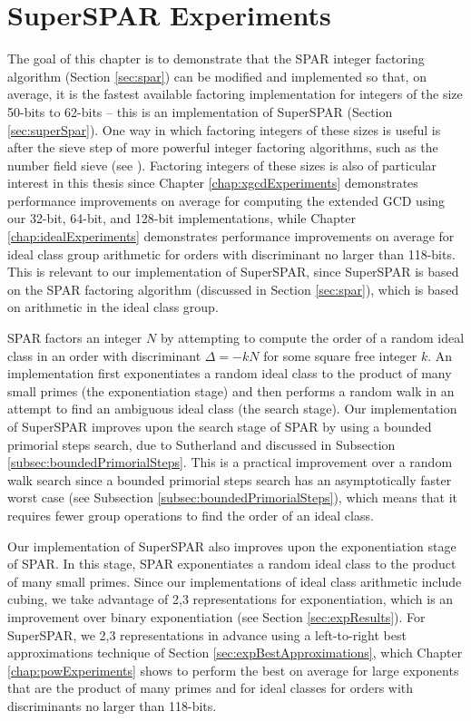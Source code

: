 \documentclass{ucalgthes1}
\theoremstyle{definition}
\begin{document}
\chapter{SuperSPAR Experiments}
\label{chap:ssparExperiments}

The goal of this chapter is to demonstrate that the SPAR integer factoring algorithm (Section \ref{sec:spar}) can be modified and implemented so that, on average, it is the fastest available factoring implementation for integers of the size 50-bits to 62-bits -- this is an implementation of SuperSPAR (Section \ref{sec:superSpar}).  One way in which factoring integers of these sizes is useful is after the sieve step of more powerful integer factoring algorithms, such as the number field sieve (see \cite[\S 6.2]{Crandall2001}).  Factoring integers of these sizes is also of particular interest in this thesis since Chapter \ref{chap:xgcdExperiments} demonstrates performance improvements on average for computing the extended GCD using our 32-bit, 64-bit, and 128-bit implementations, while Chapter \ref{chap:idealExperiments} demonstrates performance improvements on average for ideal class group arithmetic for orders with discriminant no larger than 118-bits.  This is relevant to our implementation of SuperSPAR, since SuperSPAR is based on the SPAR factoring algorithm (discussed in Section \ref{sec:spar}), which is based on arithmetic in the ideal class group.

SPAR factors an integer $N$ by attempting to compute the order of a random ideal class in an order with discriminant $\Delta = -kN$ for some square free integer $k$.  An implementation first exponentiates a random ideal class to the product of many small primes (the exponentiation stage) and then performs a random walk in an attempt to find an ambiguous ideal class (the search stage).  Our implementation of SuperSPAR improves upon the search stage of SPAR by using a bounded primorial steps search, due to Sutherland \cite{Sutherland2007} and discussed in Subsection \ref{subsec:boundedPrimorialSteps}.  This is a practical improvement over a random walk search since a bounded primorial steps search has an asymptotically faster worst case (see Subsection \ref{subsec:boundedPrimorialSteps}), which means that it requires fewer group operations to find the order of an ideal class.

Our implementation of SuperSPAR also improves upon the exponentiation stage of SPAR.  In this stage, SPAR exponentiates a random ideal class to the product of many small primes.  Since our implementations of ideal class arithmetic include cubing, we take advantage of 2,3 representations for exponentiation, which is an improvement over binary exponentiation (see Section \ref{sec:expResults}).  For SuperSPAR, we 2,3 representations in advance using a left-to-right best approximations technique of Section \ref{sec:expBestApproximations}, which Chapter \ref{chap:powExperiments} shows to perform the best on average for large exponents that are the product of many primes and for ideal classes for orders with discriminants no larger than 118-bits.
\end{document}
